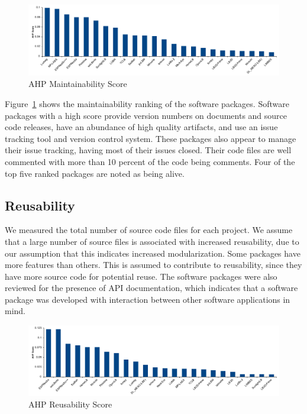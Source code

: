 \documentclass[final, 3p, times, authoryear]{elsarticle}
\begin{document}
\begin{figure}[h!]
	\begin{center}
		\includegraphics[width=1.0\textwidth]{./figures/maintainability_chart.pdf}
		\caption{AHP Maintainability Score}
		\label{Fig_Maintainability}
	\end{center}
\end{figure}

Figure~\ref{Fig_Maintainability} shows the maintainability ranking of the
software packages. Software packages with a high score provide version numbers
on documents and source code releases, have an abundance of high quality
artifacts, and use an issue tracking tool and version control system. These
packages also appear to manage their issue tracking, having most of their issues
closed. Their code files are well commented with more than 10 percent of the
code being comments. Four of the top five ranked packages are noted as being alive.

\subsection{Reusability} \label{reusabilityresults}

We measured the total number of source code files for each project. We assume
that a large number of source files is associated with increased reusability,
due to our assumption that this indicates increased modularization. Some
packages have more features than others.  This is assumed to contribute to
reusability, since they have more source code for potential reuse. The software
packages were also reviewed for the presence of API documentation, which
indicates that a software package was developed with interaction between other
software applications in mind. 

\begin{figure}[h!]
	\begin{center}
		\includegraphics[width=1.0\textwidth]{./figures/reusability_chart.pdf}
		\caption{AHP Reusability Score}
		\label{Fig_Reusabilty}
	\end{center}
\end{figure}
\end{document}
